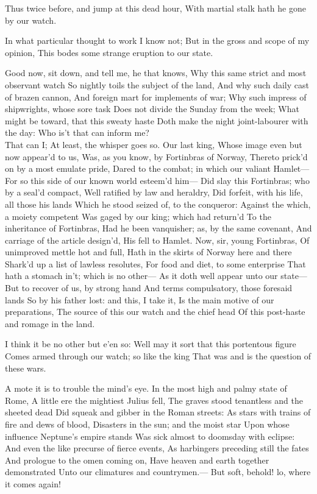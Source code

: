 \documentclass[11pt]{book}
\begin{document}
	Thus twice before, and jump at this dead hour,
	With martial stalk hath he gone by our watch.

\6	In what particular thought to work I know not;
	But in the gross and scope of my opinion,
	This bodes some strange eruption to our state.

	Good now, sit down, and tell me, he that knows,
	Why this same strict and most observant watch
	So nightly toils the subject of the land,
	And why such daily cast of brazen cannon,
	And foreign mart for implements of war;
	Why such impress of shipwrights, whose sore task
	Does not divide the Sunday from the week;
	What might be toward, that this sweaty haste
	Doth make the night joint-labourer with the day:
	Who is't that can inform me? \\

\6	That can I;
	At least, the whisper goes so. Our last king,
	Whose image even but now appear'd to us,
	Was, as you know, by Fortinbras of Norway,
	Thereto prick'd on by a most emulate pride,
	Dared to the combat; in which our valiant Hamlet---
	For so this side of our known world esteem'd him---
	Did slay this Fortinbras; who by a seal'd compact,
	Well ratified by law and heraldry,
	Did forfeit, with his life, all those his lands
	Which he stood seized of, to the conqueror:
	Against the which, a moiety competent
	Was gaged by our king; which had return'd
	To the inheritance of Fortinbras,
	Had he been vanquisher; as, by the same covenant,
	And carriage of the article design'd,
	His fell to Hamlet. Now, sir, young Fortinbras,
	Of unimproved mettle hot and full,
	Hath in the skirts of Norway here and there
	Shark'd up a list of lawless resolutes,
	For food and diet, to some enterprise
	That hath a stomach in't; which is no other---
	As it doth well appear unto our state---
	But to recover of us, by strong hand
	And terms compulsatory, those foresaid lands
	So by his father lost: and this, I take it,
	Is the main motive of our preparations,
	The source of this our watch and the chief head
	Of this post-haste and romage in the land.

	I think it be no other but e'en so:
	Well may it sort that this portentous figure
	Comes armed through our watch; so like the king
	That was and is the question of these wars.

\6	A mote it is to trouble the mind's eye.
	In the most high and palmy state of Rome,
	A little ere the mightiest Julius fell,
	The graves stood tenantless and the sheeted dead
	Did squeak and gibber in the Roman streets:
	As stars with trains of fire and dews of blood,
	Disasters in the sun; and the moist star
	Upon whose influence Neptune's empire stands
	Was sick almost to doomsday with eclipse:
	And even the like precurse of fierce events,
	As harbingers preceding still the fates
	And prologue to the omen coming on,
	Have heaven and earth together demonstrated
	Unto our climatures and countrymen.---
	But soft, behold! lo, where it comes again!
\end{document}
